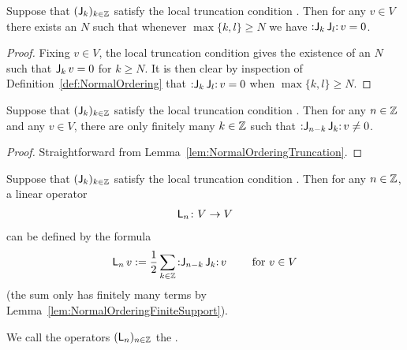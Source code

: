 \begin{lemma}
  \label{lem:NormalOrderingTruncation}
  \leanok
  Suppose that $(\mathsf{J}_{k})_{k \in \mathbb{Z}}$ satisfy the local truncation condition
  \tagHeiTrunc{}. Then for any $v \in V$ there exists an $N$ such that
  whenever $\max \{k,l\} \ge N$ we have
  ${\mathbb{:} \mathsf{J}_{k} \, \mathsf{J}_{l} \mathbb{:}} \, v = 0$.
\end{lemma}
\begin{proof}
  \leanok
  Fixing $v \in V$, the local truncation condition \tagHeiTrunc{}
  gives the existence of an $N$ such that $\mathsf{J}_{k} \, v = 0$
  for $k \ge N$. It is then clear by inspection of Definition~\ref{def:NormalOrdering}
  that ${\mathbb{:} \mathsf{J}_{k} \, \mathsf{J}_{l} \mathbb{:}} \, v = 0$ when
  $\max \{k,l\} \ge N$.
\end{proof}

\begin{lemma}
  \label{lem:NormalOrderingFiniteSupport}
  \leanok
  Suppose that $(\mathsf{J}_{k})_{k \in \mathbb{Z}}$ satisfy the local truncation condition
  \tagHeiTrunc{}. Then for any $n \in \mathbb{Z}$ and any $v \in V$,
  there are only finitely many $k \in \mathbb{Z}$ such that
  ${\mathbb{:} \mathsf{J}_{n-k} \, \mathsf{J}_k \mathbb{:}} \, v \ne 0$.
\end{lemma}
\begin{proof}
  \leanok
  Straightforward from Lemma~\ref{lem:NormalOrderingTruncation}.
\end{proof}

\begin{definition}
  \label{def:SugawaraOperator}
  \leanok
  Suppose that $(\mathsf{J}_{k})_{k \in \mathbb{Z}}$ satisfy the local truncation condition
  \tagHeiTrunc{}. Then for any $n \in \mathbb{Z}$, a linear operator
  \begin{align*}
    \mathsf{L}_n \colon V \to V
  \end{align*}
  can be defined by the formula
  \begin{align*}
    \mathsf{L}_n \, v := \frac{1}{2} \sum_{k \in \mathbb{Z}} {\mathbb{:} \mathsf{J}_{n-k} \, \mathsf{J}_k \mathbb{:}} \, v
    \qquad \text{ for } v \in V
  \end{align*}
  (the sum only has finitely many terms by Lemma~\ref{lem:NormalOrderingFiniteSupport}).

  We call the operators $(\mathsf{L}_n)_{n \in \mathbb{Z}}$ the .
\end{definition}

